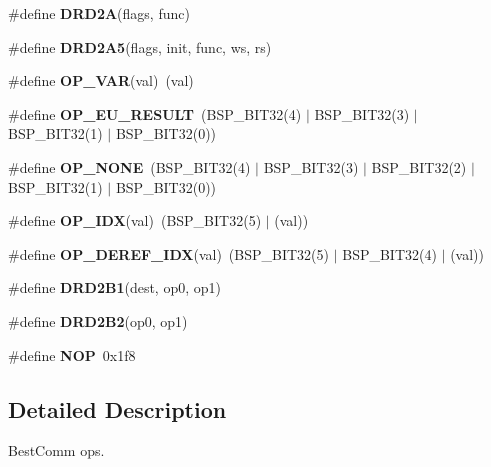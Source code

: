\begin{DoxyCompactItemize}
\item 
\#define {\bfseries D\+R\+D2A}(flags,  func)
\item 
\#define {\bfseries D\+R\+D2\+A5}(flags,  init,  func,  ws,  rs)
\item 
\mbox{\label{group__BestCommOps_gad1605182ed0a973570ca097a68c52c1f}} 
\#define {\bfseries O\+P\+\_\+\+V\+AR}(val)~(val)
\item 
\mbox{\label{group__BestCommOps_gab55052a99f334840ad3eec50fa1b3ae0}} 
\#define {\bfseries O\+P\+\_\+\+E\+U\+\_\+\+R\+E\+S\+U\+LT}~(B\+S\+P\+\_\+\+B\+I\+T32(4) $\vert$ B\+S\+P\+\_\+\+B\+I\+T32(3) $\vert$ B\+S\+P\+\_\+\+B\+I\+T32(1) $\vert$ B\+S\+P\+\_\+\+B\+I\+T32(0))
\item 
\mbox{\label{group__BestCommOps_gab2ee9d111f415c5df9ef71f3f4544e85}} 
\#define {\bfseries O\+P\+\_\+\+N\+O\+NE}~(B\+S\+P\+\_\+\+B\+I\+T32(4) $\vert$ B\+S\+P\+\_\+\+B\+I\+T32(3) $\vert$ B\+S\+P\+\_\+\+B\+I\+T32(2) $\vert$ B\+S\+P\+\_\+\+B\+I\+T32(1) $\vert$ B\+S\+P\+\_\+\+B\+I\+T32(0))
\item 
\mbox{\label{group__BestCommOps_gadae7d17a05752a475c8cc98dcf73c28d}} 
\#define {\bfseries O\+P\+\_\+\+I\+DX}(val)~(B\+S\+P\+\_\+\+B\+I\+T32(5) $\vert$ (val))
\item 
\mbox{\label{group__BestCommOps_ga37a1219b493a2b7afd7e372d2b0bdf39}} 
\#define {\bfseries O\+P\+\_\+\+D\+E\+R\+E\+F\+\_\+\+I\+DX}(val)~(B\+S\+P\+\_\+\+B\+I\+T32(5) $\vert$ B\+S\+P\+\_\+\+B\+I\+T32(4) $\vert$ (val))
\item 
\#define {\bfseries D\+R\+D2\+B1}(dest,  op0,  op1)
\item 
\#define {\bfseries D\+R\+D2\+B2}(op0,  op1)
\item 
\mbox{\label{group__BestCommOps_ga700f88377bf36711b711f69b06c52f5d}} 
\#define {\bfseries N\+OP}~0x1f8
\end{DoxyCompactItemize}


\subsection{Detailed Description}
Best\+Comm ops. 



